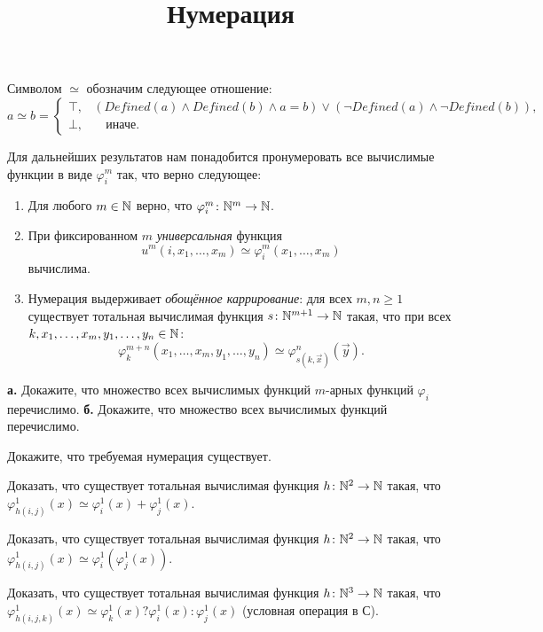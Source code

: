 \documentclass[a4paper, 12pt, num=ТА3]{listok}
\renewcommand{\phi}{\varphi}
\begin{document}
\title{Нумерация}
\maketitle
\begin{definition}
	Символом $\simeq$ обозначим следующее отношение:
	\[
		a \simeq b = \left \{ \begin{aligned}
					\top, & (Defined(a) \wedge Defined(b) \wedge a = b) \vee (\neg Defined(a) \wedge \neg Defined(b)), \\
					\bot, & \quad{} \text{иначе}.
				\end{aligned} \right .
	\]
\end{definition}
Для дальнейших результатов нам понадобится пронумеровать все вычислимые функции в виде $\phi_i^m$ так, что верно следующее:
\begin{enumerate}[label=\arabic*.]
	\item Для любого $m \in \mathbb{N}$ верно, что $\phi_i^m \colon \N^m \to \N$.
	\item При фиксированном $m$ \textit{универсальная} функция
		\[
			u^m(i, x_1, \ldots, x_m) \simeq \phi_i^m(x_1, \ldots, x_m)
		\]
		вычислима.
	\item Нумерация выдерживает \textit{обощённое каррирование}: для всех $m, n \ge 1$ существует тотальная вычислимая функция $s \colon \mathbb{N}^{m + 1} \to \mathbb{N}$ такая,
		что при всех $k, x_1, \ldots, x_m, y_1, \ldots, y_n \in \mathbb{N}$:
		\[
			\phi_k^{m + n}(x_1, \ldots, x_m, y_1, \ldots, y_n) \simeq \phi_{s(k, \vec{x})}^n(\vec{y}).
		\]
\end{enumerate}
\begin{problem}
	\textbf{а.} Докажите, что множество всех вычислимых функций $m$-арных функций $\phi_i$ перечислимо.
	\textbf{б.} Докажите, что множество всех вычислимых функций перечислимо.
\end{problem}
\begin{problem}
	Докажите, что требуемая нумерация существует.
\end{problem}
\begin{problem}
	Доказать, что существует тотальная вычислимая функция $h \colon \mathbb{N}^2 \to \mathbb{N}$ такая, что $\phi^1_{h(i,j)} (x) \simeq \phi^1_i (x) + \phi^1_j (x)$.
\end{problem}
\begin{problem}
	Доказать, что существует тотальная вычислимая функция $h \colon \mathbb{N}^2 \to \mathbb{N}$ такая, что $\phi^1_{h(i,j)} (x) \simeq \phi^1_i (\phi_j^1(x))$.
\end{problem}
\begin{problem}
	Доказать, что существует тотальная вычислимая функция $h \colon \mathbb{N}^3 \to \mathbb{N}$ такая,
	что $\phi^1_{h(i,j,k)}(x) \simeq \phi^1_k (x)? \phi^1_i (x) : \phi^1_j(x)$ (условная операция в С).
\end{problem}
\end{document}
